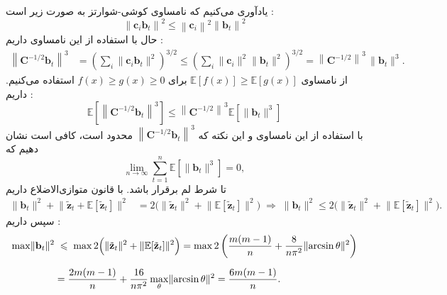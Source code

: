 \begin{اثبات}
	یادآوری می‌کنیم که نامساوی کوشی-شوارتز به صورت زیر است :
	\begin{equation}
		\left\lVert \mathbf{c}_i\mathbf{b}_t\right\rVert^2 \leq \left\lVert\mathbf{c}_i\right\rVert^2 \left\lVert\mathbf{b}_t\right\rVert^2
	\end{equation}
	حال با استفاده از این نامساوی داریم :
	\begin{align}
		\left\lVert \mathbf{C}^{-1/2}\mathbf{b}_{t}\right\rVert^{3}
		&=\left(\sum_{i}\lVert \mathbf{c}_{i}\mathbf{b}_{t}\rVert^{2}\right)^{\!3/2}
		\le \left(\sum_{i}\lVert \mathbf{c}_{i}\rVert^{2}\lVert \mathbf{b}_{t}\rVert^{2}\right)^{\!3/2}
		=\left\lVert \mathbf{C}^{-1/2}\right\rVert^{3}\,\lVert \mathbf{b}_{t}\rVert^{3}. 
	\end{align}
	از نامساوی 
	$\mathbb{E}[f(x)] \geq \mathbb{E}[g(x)]$
	برای 
	$f(x) \geq g(x) \geq 0$
	استفاده می‌کنیم. داریم :
	\begin{equation}
		\mathbb{E}[\left\lVert \mathbf{C}^{-1/2}\mathbf{b}_{t}\right\rVert^{3}] \leq \left\lVert \mathbf{C}^{-1/2}\right\rVert^{3} \mathbb{E}[\lVert \mathbf{b}_{t}\rVert^{3}]
	\end{equation}
	با استفاده از این نامساوی و این نکته که 
	$\left\lVert \mathbf{C}^{-1/2}\mathbf{b}_{t}\right\rVert^{3}$
	محدود است، کافی است نشان دهیم که
	\begin{equation}
		\lim_{n\to\infty}\sum_{t=1}^{n}\mathbb{E}\!\left[\lVert \mathbf{b}_{t}\rVert^{3}\right]=0,
	\end{equation}
	تا شرط لم برقرار باشد. با قانون متوازی‌الاضلاع داریم
	\begin{align}
		\lVert \mathbf{b}_{t}\rVert^{2}+\lVert \tilde{\mathbf{z}}_{t}+\mathbb{E}[\tilde{\mathbf{z}}_{t}]\rVert^{2}
		&=2\big(\lVert \tilde{\mathbf{z}}_{t}\rVert^{2}+\lVert \mathbb{E}[\tilde{\mathbf{z}}_{t}]\rVert^{2}\big)
		\;\Rightarrow\;
		\lVert \mathbf{b}_{t}\rVert^{2}\le 2\big(\lVert \tilde{\mathbf{z}}_{t}\rVert^{2}+\lVert \mathbb{E}[\tilde{\mathbf{z}}_{t}]\rVert^{2}\big).
	\end{align}
	سپس داریم :
	\begin{align}
		\max \lVert \mathbf{b}_{t} \rVert^{2}
		&\;\le\;
		\max 2\Big( \lVert \tilde{\mathbf{z}}_{t} \rVert^{2}
		+ \lVert \mathbb{E}[\tilde{\mathbf{z}}_{t}] \rVert^{2}\Big)
		= \max 2\left(\frac{m(m-1)}{n} + \frac{8}{n\pi^{2}}\lVert \arcsin \theta \rVert^{2}\right) \notag \\[6pt]
		&= \frac{2m(m-1)}{n} + \frac{16}{n\pi^{2}}\max_{\theta}\lVert \arcsin \theta \rVert^{2}
		= \frac{6m(m-1)}{n}.
	\end{align}
	

\end{اثبات}
